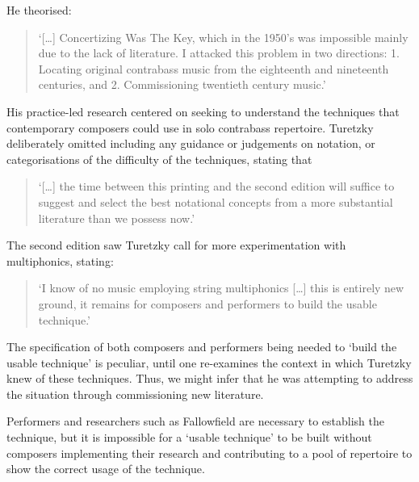 He theorised: 
\begin{quote}
 ‘[…] Concertizing Was The Key, which in the 1950’s was impossible mainly due to the lack of literature. I attacked this problem in two directions: 1. Locating original contrabass music from the eighteenth and nineteenth centuries, and 2. Commissioning twentieth century music.’\autocite[vii]{turetzkyContemporaryContrabass1974}
\end{quote}
His practice-led research centered on seeking to understand the techniques that contemporary composers could use in solo contrabass repertoire. 
Turetzky deliberately omitted including any guidance or judgements on notation, or categorisations of the difficulty of the techniques, stating that \begin{quote}
 ‘[…] the time between this printing and the second edition will suffice to suggest and select the best notational concepts from a more substantial literature than we possess now.’\autocite[ix]{turetzkyContemporaryContrabass1974} 
\end{quote} The second edition saw Turetzky call for more experimentation with multiphonics, stating:
\begin{quote}
 ‘I know of no music employing string multiphonics […] this is entirely new ground, it remains for composers and performers to build the usable technique.’\autocite[138]{turetzkyContemporaryContrabass1992}
\end{quote}
The specification of both composers and performers being needed to ‘build the usable technique’ is peculiar, until one re-examines the context in which Turetzky knew of these techniques. 
Thus, we might infer that he was attempting to address the situation through commissioning new literature.

Performers and researchers such as Fallowfield are necessary to establish the technique, but it is impossible for a ‘usable technique’ to be built without composers implementing their research and contributing to a pool of repertoire to show the correct usage of the technique.


